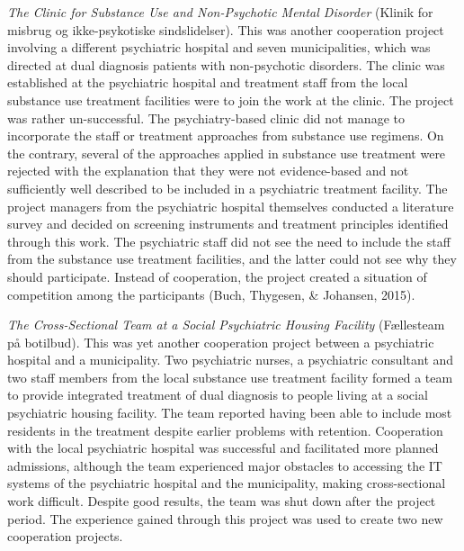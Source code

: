 \begin{multicols}{2}
\par
\textit{The Clinic for Substance Use and Non-Psychotic Mental Disorder} (Klinik for misbrug og ikke-psykotiske sindslidelser). This was another cooperation project involving a different psychiatric hospital and seven municipalities, which was directed at dual diagnosis patients with non-psychotic disorders. The clinic was established at the psychiatric hospital and treatment staff from the local substance use treatment facilities were to join the work at the clinic. The project was rather un-successful. The psychiatry-based clinic did not manage to incorporate the staff or treatment approaches from substance use regimens. On the contrary, several of the approaches applied in substance use treatment were rejected with the explanation that they were not evidence-based and not sufficiently well described to be included in a psychiatric treatment facility. The project managers from the psychiatric hospital themselves conducted a literature survey and decided on screening instruments and treatment principles identified through this work. The psychiatric staff did not see the need to include the staff from the substance use treatment facilities, and the latter could not see why they should participate. Instead of cooperation, the project created a situation of competition among the participants (Buch, Thygesen, \& Johansen, 2015).
\par
\textit{The Cross-Sectional Team at a Social Psychiatric Housing Facility} (Fællesteam på botilbud). This was yet another cooperation project between a psychiatric hospital and a municipality. Two psychiatric nurses, a psychiatric consultant and two staff members from the local substance use treatment facility formed a team to provide integrated treatment of dual diagnosis to people living at a social psychiatric housing facility. The team reported having been able to include most residents in the treatment despite earlier problems with retention. Cooperation with the local psychiatric hospital was successful and facilitated more planned admissions, although the team experienced major obstacles to accessing the IT systems of the psychiatric hospital and the municipality, making cross-sectional work difficult. Despite good results, the team was shut down after the project period. The experience gained through this project was used to create two new cooperation projects.
\par

\end{multicols}
